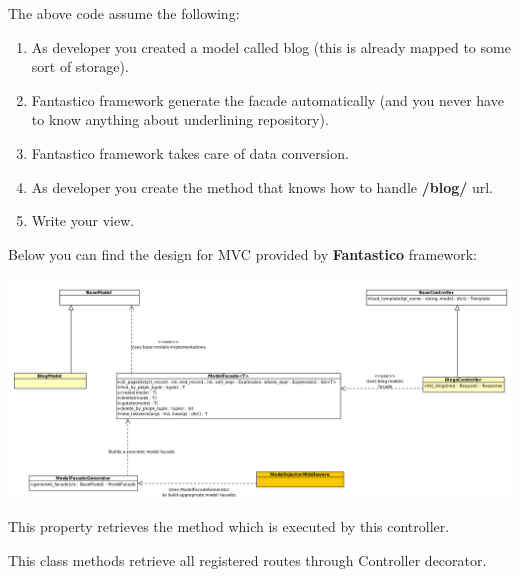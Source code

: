 \documentclass[letterpaper,10pt,english]{sphinxmanual}
\begin{document}
\begin{fulllineitems}
The above code assume the following:
\begin{enumerate}
\item {} 
As developer you created a model called blog (this is already mapped to some sort of storage).

\item {} 
Fantastico framework generate the facade automatically (and you never have to know anything about underlining repository).

\item {} 
Fantastico framework takes care of data conversion.

\item {} 
As developer you create the method that knows how to handle \textbf{/blog/} url.

\item {} 
Write your view.

\end{enumerate}

Below you can find the design for MVC provided by \textbf{Fantastico} framework:

\includegraphics{mvc.png}

\begin{fulllineitems}
\label{features/mvc:fantastico.mvc.controller_decorators.Controller.fn_handler}
This property retrieves the method which is executed by this controller.

\end{fulllineitems}


\begin{fulllineitems}
\label{features/mvc:fantastico.mvc.controller_decorators.Controller.get_registered_routes}
This class methods retrieve all registered routes through Controller decorator.


\end{fulllineitems}
\end{fulllineitems}
\end{document}
